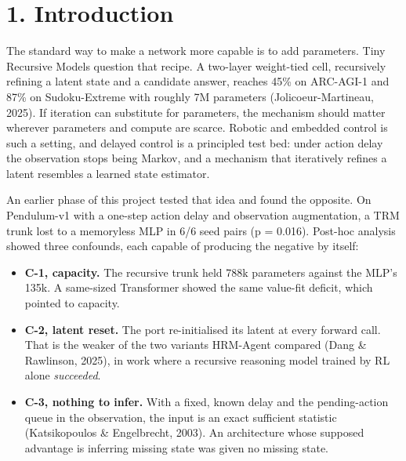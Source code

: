\documentclass[11pt]{article}
\begin{document}
\begin{abstract}
As a controller TRM offers a trade rather than a win. Its greedy policy commands far smoother torque (0.4 vs 9 direction reversals per second, 11/12 pairs) at a final return only 3.6 units lower. It pays with 65$\times$ the MLP's per-decision latency (a 242 Hz ceiling on one CPU thread), 11--13$\times$ its training cost, and a narrower robustness envelope under sensor noise, plant mismatch and actuator dropout. The residual-uncertainty hypothesis is rejected, and so is the capacity account. Recursion ported without TRM's supervised training discipline does not transfer to this setting.



\end{abstract}

\section*{1. Introduction}



The standard way to make a network more capable is to add parameters. Tiny Recursive Models question that recipe. A two-layer weight-tied cell, recursively refining a latent state and a candidate answer, reaches 45\% on ARC-AGI-1 and 87\% on Sudoku-Extreme with roughly 7M parameters (Jolicoeur-Martineau, 2025). If iteration can substitute for parameters, the mechanism should matter wherever parameters and compute are scarce. Robotic and embedded control is such a setting, and delayed control is a principled test bed: under action delay the observation stops being Markov, and a mechanism that iteratively refines a latent resembles a learned state estimator.



An earlier phase of this project tested that idea and found the opposite. On Pendulum-v1 with a one-step action delay and observation augmentation, a TRM trunk lost to a memoryless MLP in 6/6 seed pairs (p = 0.016). Post-hoc analysis showed three confounds, each capable of producing the negative by itself:

\begin{itemize}
\item \textbf{C-1, capacity.} The recursive trunk held 788k parameters against the MLP's 135k. A same-sized Transformer showed the same value-fit deficit, which pointed to capacity.
\item \textbf{C-2, latent reset.} The port re-initialised its latent at every forward call. That is the weaker of the two variants HRM-Agent compared (Dang \& Rawlinson, 2025), in work where a recursive reasoning model trained by RL alone \emph{succeeded}.
\item \textbf{C-3, nothing to infer.} With a fixed, known delay and the pending-action queue in the observation, the input is an exact sufficient statistic (Katsikopoulos \& Engelbrecht, 2003). An architecture whose supposed advantage is inferring missing state was given no missing state.
\end{itemize}
\end{document}
